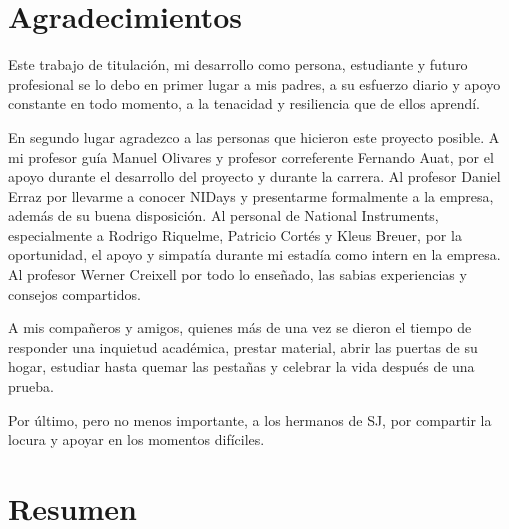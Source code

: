 \documentclass[../main.tex]{subfiles}
\begin{document}
\section*{Agradecimientos}
	Este trabajo de titulación,  mi desarrollo como persona, estudiante y futuro profesional se lo debo en primer lugar a mis padres, a su esfuerzo diario y apoyo constante en todo momento, a la tenacidad y resiliencia que de ellos aprendí.  
\hfill \break

En segundo lugar agradezco a las personas que hicieron este proyecto posible. A mi profesor guía Manuel Olivares y profesor correferente Fernando Auat, por el apoyo durante el desarrollo del proyecto y durante la carrera. 
Al profesor Daniel Erraz por llevarme a conocer NIDays y presentarme formalmente a la empresa, además de su buena disposición. Al personal de National Instruments, especialmente a Rodrigo Riquelme, Patricio Cortés y Kleus Breuer, por la oportunidad, el apoyo y simpatía durante mi estadía como intern en la empresa. Al profesor Werner Creixell por todo lo enseñado, las sabias experiencias y consejos compartidos.
\hfill \break

A mis compañeros y amigos, quienes más de una vez se dieron el tiempo de responder una inquietud académica, prestar material, abrir las puertas de su hogar, estudiar hasta quemar las pestañas y celebrar la vida después de una prueba. 
\hfill \break

Por último, pero no menos importante, a los hermanos de SJ, por compartir la locura y apoyar en los momentos difíciles. 
\newpage
	
\section*{Resumen}
	
\end{document}
